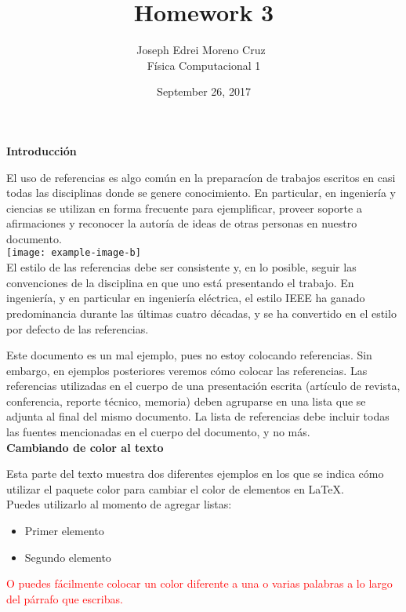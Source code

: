 \documentclass[letterpaper,twocolumn,10pt,draft]{article}
\title{Homework 3}
\author{Joseph Edrei Moreno Cruz~\\ 
F\'isica Computacional 1}
\date{September 26, 2017}
\begin{document}
\maketitle

\textbf{Introducci\'on}

El uso de referencias es algo com\'un en la preparac\'ion de trabajos escritos en casi todas las disciplinas donde se genere conocimiento. En particular, en ingenier\'ia y ciencias se utilizan en forma frecuente para ejemplificar, proveer soporte a afirmaciones y reconocer la autor\'ia de ideas de otras personas en
nuestro documento.\\

\texttt{[image: example-image-b]}\\

El estilo de las referencias debe ser consistente y, en lo posible, seguir las convenciones de la disciplina en que uno est\'a presentando el trabajo. En ingenier\'ia, y en particular en ingenier\'ia el\'ectrica, el estilo IEEE ha ganado predominancia durante las \'ultimas cuatro d\'ecadas, y se ha convertido en el estilo por defecto de las referencias.
\vspace*{2\baselineskip}

Este documento es un mal ejemplo, pues no estoy colocando referencias. Sin embargo, en ejemplos posteriores veremos c\'omo colocar las referencias. Las referencias utilizadas en el cuerpo de una presentaci\'on escrita (art\'iculo de revista, conferencia, reporte t\'ecnico, memoria) deben agruparse en una lista que se adjunta al final del mismo documento. La lista de referencias debe incluir todas las fuentes mencionadas en el cuerpo del documento, y no m\'as.
\\

\textbf{Cambiando de color al texto} \par
Esta parte del texto muestra dos diferentes ejemplos en los que se indica c\'omo utilizar el paquete color para cambiar el color de elementos en \LaTeX .\\
 Puedes utilizarlo al momento de agregar listas:
\begin{itemize}
\color{blue}
\item Primer elemento
\item Segundo elemento
\end{itemize}

\textcolor{red}{O puedes f\'acilmente colocar un color diferente a una o varias palabras a lo largo del p\'arrafo que escribas.}
\end{document}
